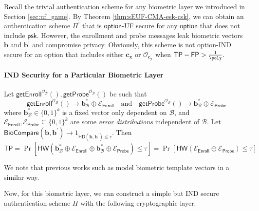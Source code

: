Recall the trivial authentication scheme for any biometric layer we introduced in Section \ref{sec:uf_game}. By Theorem \ref{thm:sEUF-CMA-esk-csk}, we can obtain an authentication scheme $\Pi^\prime$ that is $\mathsf{option}$-UF secure for any $\mathsf{option}$ that does not include $\textsf{psk}$.
However, the enrollment and probe messages leak biometric vectors $\mathbf{b}$ and $\mathbf{b}^\prime$ and compromise privacy. Obviously, this scheme is not \textsf{option}-IND secure for an \textsf{option} that includes either $\mathbf{c_x}$ or $\mathcal{O}_{\mathbf{c_y}}$ when $\mathsf{TP} - \mathsf{FP} > \frac{1}{\poly}$.

\paragraph{IND Security for a Particular Biometric Layer}

Let $\mathsf{getEnroll}^{\mathcal{O}_{\mathcal{B}}}(), \textsf{getProbe}^{\mathcal{O}_{\mathcal{B}}}()$ be such that
\[
	\textsf{getEnroll}^{\mathcal{O}_{\mathcal{B}}}() \to \mathbf{b}^*_{\mathcal{B}} \oplus \mathcal{E}_{\textsf{Enroll}}  \quad \text{and} \quad \textsf{getProbe}^{\mathcal{O}_{\mathcal{B}}}() \to \mathbf{b}^*_{\mathcal{B}} \oplus \mathcal{E}_{\textsf{Probe}}
\]
where $\mathbf{b}^*_{\mathcal{B}} \in \{0, 1\}^k$ is a fixed vector only dependent on $\mathcal{B}$, and $\mathcal{E}_{\mathsf{Enroll}}, \mathcal{E}_{\mathsf{Probe}} \subseteq \{0, 1\}^k$ are some \emph{error distributions} independent of $\mathcal{B}$. Let $\mathsf{BioCompare}(\mathbf{b}, \mathbf{b}^\prime) \to 1_{\mathsf{HD}(\mathbf{b}, \mathbf{b}^\prime) \leq \tau}$. Then
\[
	\textsf{TP} = \Pr[ \textsf{HW}(\mathbf{b}^*_{\mathcal{B}} \oplus \mathcal{E}_{\textsf{Enroll}} \oplus \mathbf{b}^*_{\mathcal{B}} \oplus \mathcal{E}_{\textsf{Probe}}) \leq \tau ] = \Pr[ \textsf{HW}(\mathcal{E}_{\textsf{Enroll}} \oplus \mathcal{E}_{\textsf{Probe}}) \leq \tau ]
\]

\noindent We note that previous works such as \cite{10.1145/1030083.1030096,cryptoeprint:2014/394} model biometric template vectors in a similar way.

Now, for this biometric layer, we can construct a simple but IND secure authentication scheme $\Pi$ with the following cryptographic layer.

